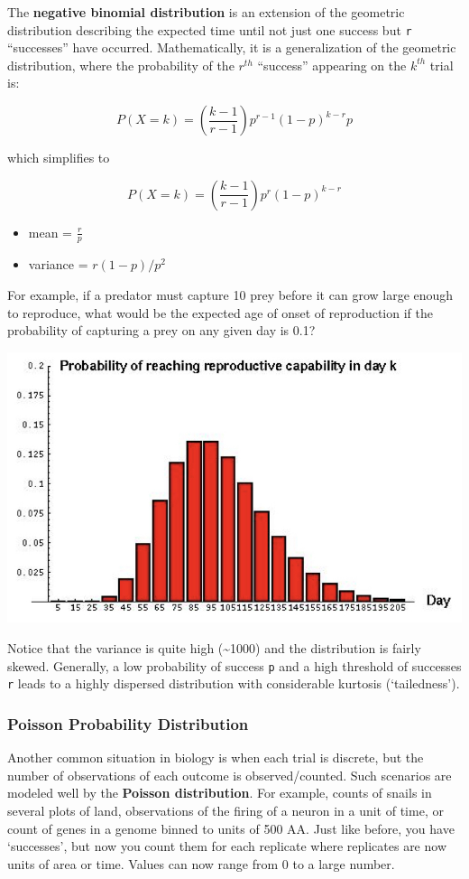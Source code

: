 \documentclass[]{book}
\providecommand{\tightlist}{%
  \setlength{\itemsep}{0pt}\setlength{\parskip}{0pt}}
\begin{document}
The \textbf{negative binomial distribution} is an extension of the geometric distribution describing the expected time until not just one success but \texttt{r} ``successes'' have occurred. Mathematically, it is a generalization of the geometric distribution, where the probability of the \(r^{th}\) ``success'' appearing on the \(k^{th}\) trial is:

\[P(X=k)=(\frac{k-1}{r-1})p^{r-1}(1-p)^{k-r}p\]

which simplifies to

\[P(X=k)=(\frac{k-1}{r-1})p^{r}(1-p)^{k-r}\]

\begin{itemize}
\tightlist
\item
  mean = \(\frac{r}{p}\)
\item
  variance = \(r(1-p)/p^2\)
\end{itemize}

For example, if a predator must capture 10 prey before it can grow large enough to reproduce, what would be the expected age of onset of reproduction if the probability of capturing a prey on any given day is 0.1?

\begin{center}\includegraphics[width=0.5\linewidth]{images/prob.018} \end{center}

Notice that the variance is quite high (\textasciitilde{}1000) and the distribution is fairly skewed. Generally, a low probability of success \texttt{p} and a high threshold of successes \texttt{r} leads to a highly dispersed distribution with considerable kurtosis (`tailedness').

\hypertarget{poisson-probability-distribution}{%
\subsubsection{\texorpdfstring{\textbf{Poisson Probability Distribution}}{Poisson Probability Distribution}}\label{poisson-probability-distribution}}

Another common situation in biology is when each trial is discrete, but the number of observations of each outcome is observed/counted. Such scenarios are modeled well by the \textbf{Poisson distribution}. For example, counts of snails in several plots of land, observations of the firing of a neuron in a unit of time, or count of genes in a genome binned to units of 500 AA. Just like before, you have `successes', but now you count them for each replicate where replicates are now units of area or time. Values can now range from 0 to a large number.
\end{document}
